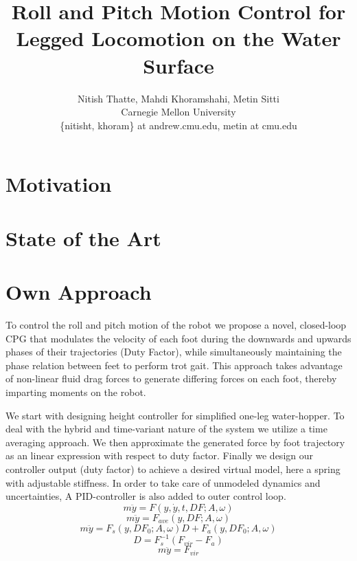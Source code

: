 \documentclass[letterpaper,twocolumn]{article}
\title{Roll and Pitch Motion Control for Legged Locomotion on the Water Surface}
\author{\small Nitish Thatte, Mahdi Khoramshahi, Metin Sitti \\
        \small Carnegie Mellon University \\
        \small \{nitisht, khoram\} at andrew.cmu.edu, metin at cmu.edu
}
\date{}
\begin{document}
\maketitle

\section*{Motivation}


\section*{State of the Art}


\section*{Own Approach}
To control the roll and pitch motion of the robot we propose a novel, closed-loop CPG that modulates the velocity of each foot during the downwards and upwards phases of their trajectories (Duty Factor), while simultaneously maintaining the phase relation between feet to perform trot gait. This approach takes advantage of non-linear fluid drag forces to generate differing forces on each foot, thereby imparting moments on the robot. 
	
We start with designing height controller for simplified one-leg water-hopper. To deal with the hybrid and time-variant nature of the system we utilize a time averaging approach. We then approximate the generated force by foot trajectory as an linear expression with respect to duty factor. Finally we design our controller output (duty factor) to achieve a desired virtual model, here a spring with adjustable stiffness. In order to take care of unmodeled dynamics and uncertainties, A PID-controller is also added to outer control loop.\\


\begin{equation}
	m \ddot{y} =  F(y,\dot{y},t,DF;A,\omega)
	\label{eq:force}
\end{equation}
\begin{equation}
	m \ddot{y} = F_{ave}(y,DF;A,\omega)
	\label{eq:force_ave}
\end{equation}
\begin{equation}
	m \ddot{y} = F_{s}(y,DF_0;A,\omega)D+F_{a}(y,DF_0;A,\omega)
	\label{eq:force_linear}
\end{equation}
\begin{equation}	
	D = F_{s}^{-1}(F_{vir}-F_{a})
	\label{eq:control}
\end{equation}
\begin{equation}	
	m\ddot{y} = F_{vir}
	\label{eq:virtual_model}
\end{equation}
\end{document}
